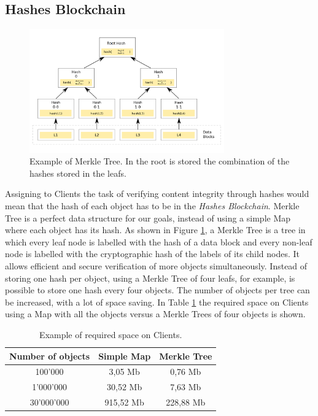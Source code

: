 \documentclass[hidelinks,conference,compsoc]{IEEEtran}
\begin{document}
\subsection{Hashes Blockchain}
\label{sec:Clienthashes}
\begin{figure}[!h]
	\centering
	\includegraphics[width=3.3in]{images/Merkletree.png}
	
	\caption{Example of Merkle Tree. In the root is stored the combination of the hashes stored in the leafs.}
	\label{fig:tree}
\end{figure} 
Assigning to Clients the task of verifying content integrity through hashes would mean that the hash of each object has to be in the \textit{Hashes Blockchain}. Merkle Tree is a perfect data structure for our goals, instead of using a simple Map where each object has its hash. As shown in Figure \ref{fig:tree}, a Merkle Tree is a tree in which every leaf node is labelled with the hash of a data block and every non-leaf node is labelled with the cryptographic hash of the labels of its child nodes. It allows efficient and secure verification of more objects simultaneously. Instead of storing one hash per object, using a Merkle Tree of four leafs, for example, is possible to store one hash every four objects. The number of objects per tree can be increased, with a lot of space saving. In Table \ref{table_space} the required space on Clients using a Map with all the objects versus a Merkle Trees of four objects is shown. 

\begin{table}[!h]
	\renewcommand{\arraystretch}{1.3}
	\caption{Example of required space on Clients.}
	\label{table_space}
	\centering
	\begin{tabular}{|c|c|c|}
	\hline
	\textbf{Number of objects} & \textbf{Simple Map} & \textbf{Merkle Tree}\\
	\hline
	\hline
	100'000 & 3,05 Mb & 0,76 Mb\\
	\hline
	1'000'000 & 30,52 Mb & 7,63 Mb \\
	\hline
	30'000'000 & 915,52 Mb & 228,88 Mb\\
	\hline
	\end{tabular}
\end{table}
\end{document}

